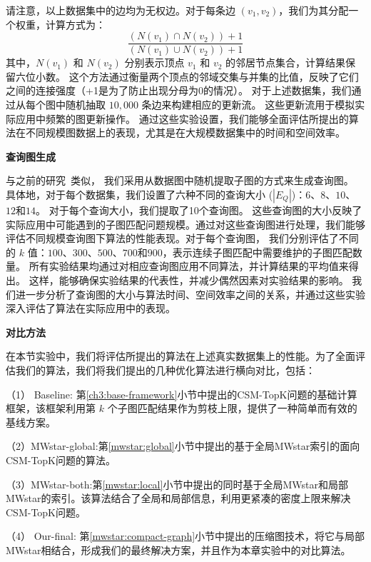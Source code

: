 请注意，以上数据集中的边均为无权边。对于每条边 $(v_1, v_2)$，我们为其分配一个权重，计算方式为：
\begin{equation}
    \frac{(N(v_1) \cap N(v_2)) + 1}{(N(v_1) \cup N(v_2)) + 1}
\end{equation}
其中，$N(v_1)$ 和 $N(v_2)$ 分别表示顶点 $v_1$ 和 $v_2$ 的邻居节点集合，计算结果保留六位小数。
这个方法通过衡量两个顶点的邻域交集与并集的比值，反映了它们之间的连接强度（+1是为了防止出现分母为0的情况）。
对于上述数据集，我们通过从每个图中随机抽取 $10,000$ 条边来构建相应的更新流。
这些更新流用于模拟实际应用中频繁的图更新操作。
通过这些实验设置，我们能够全面评估所提出的算法在不同规模图数据上的表现，尤其是在大规模数据集中的时间和空间效率。


\textbf{查询图生成}
\label{ss-sec:querygen}

与之前的研究~\cite{csm-turboflux-DBLP:conf/sigmod/KimSHLHCSJ18,csm-symbi-DBLP:journals/pvldb/MinPPGIH21,csm-survey:DBLP:journals/pvldb/SunSLH22}类似，
我们采用从数据图中随机提取子图的方式来生成查询图。
具体地，对于每个数据集，我们设置了六种不同的查询大小 ($|E_Q|$)：$6$、$8$、$10$、$12$和$14$。
对于每个查询大小，我们提取了10个查询图。
这些查询图的大小反映了实际应用中可能遇到的子图匹配问题规模。通过对这些查询图进行处理，我们能够评估不同规模查询图下算法的性能表现。对于每个查询图，
我们分别评估了不同的 $k$ 值：$100$、$300$、$500$、$700$和$900$，表示连续子图匹配中需要维护的子图匹配数量。
所有实验结果均通过对相应查询图应用不同算法，并计算结果的平均值来得出。
这样，能够确保实验结果的代表性，并减少偶然因素对实验结果的影响。
我们进一步分析了查询图的大小与算法时间、空间效率之间的关系，并通过这些实验深入评估了算法在实际应用中的表现。

\textbf{对比方法}

在本节实验中，我们将评估所提出的算法在上述真实数据集上的性能。为了全面评估我们的算法，我们将我们提出的几种优化算法进行横向对比，包括：

（1） Baseline: 第\ref{ch3:base-framework}小节中提出的CSM-TopK问题的基础计算框架，该框架利用第 $k$ 个子图匹配结果作为剪枝上限，提供了一种简单而有效的基线方案。

（2）MWstar-global:第\ref{mwstar:global}小节中提出的基于全局MWstar索引的面向CSM-TopK问题的算法。

（3）MWstar-both:第\ref{mwstar:local}小节中提出的同时基于全局MWstar和局部MWstar的索引。该算法结合了全局和局部信息，利用更紧凑的密度上限来解决CSM-TopK问题。

（4） Our-final: 第\ref{mwstar:compact-graph}小节中提出的压缩图技术，将它与局部MWstar相结合，形成我们的最终解决方案，并且作为本章实验中的对比算法。


